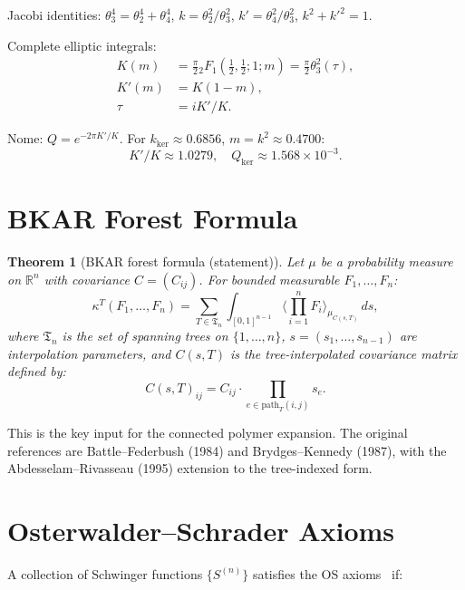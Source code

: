\documentclass[12pt]{article}
\theoremstyle{plain}
\newtheorem{theorem}{Theorem}[section]
\theoremstyle{definition}
\numberwithin{equation}{section}
\newcommand{\R}{\mathbb{R}}
\newcommand{\kker}{\mathrm{ker}}
\begin{document}
Jacobi identities: $\theta_3^4=\theta_2^4+\theta_4^4$, $k=\theta_2^2/\theta_3^2$, $k'=\theta_4^2/\theta_3^2$, $k^2+k'^2=1$.

Complete elliptic integrals:
\begin{align}
K(m) &= \frac{\pi}{2}{}_2F_1\!\left(\frac{1}{2},\frac{1}{2};1;m\right) = \frac{\pi}{2}\theta_3^2(\tau),\\
K'(m) &= K(1-m),\\
\tau &= iK'/K.
\end{align}

Nome: $Q=e^{-2\pi K'/K}$.  For $k_{\kker}\approx 0.6856$, $m=k^2\approx 0.4700$:
\begin{equation}
K'/K\approx 1.0279,\quad Q_{\kker}\approx 1.568\times 10^{-3}.
\end{equation}


\section{BKAR Forest Formula}\label{app:BKAR}

\begin{theorem}[BKAR forest formula (statement)]
Let $\mu$ be a probability measure on $\R^n$ with covariance $C=(C_{ij})$.  For bounded measurable $F_1,\ldots,F_n$:
\begin{equation}
\kappa^T(F_1,\ldots,F_n) = \sum_{T\in\mathfrak{T}_n}\int_{[0,1]^{n-1}}\Big\langle\prod_{i=1}^n F_i\Big\rangle_{\mu_{C(s,T)}}\,ds,
\end{equation}
where $\mathfrak{T}_n$ is the set of spanning trees on $\{1,\ldots,n\}$, $s=(s_1,\ldots,s_{n-1})$ are interpolation parameters, and $C(s,T)$ is the tree-interpolated covariance matrix defined by:
\begin{equation}
C(s,T)_{ij} = C_{ij}\cdot\prod_{e\in\mathrm{path}_T(i,j)}s_e.
\end{equation}
\end{theorem}

This is the key input for the connected polymer expansion.  The original references are Battle--Federbush (1984) and Brydges--Kennedy (1987), with the Abdesselam--Rivasseau (1995) extension to the tree-indexed form.


\section{Osterwalder--Schrader Axioms}\label{app:OS}

A collection of Schwinger functions $\{S^{(n)}\}$ satisfies the OS axioms~\cite{OsterwalderSchrader} if:
\end{document}
